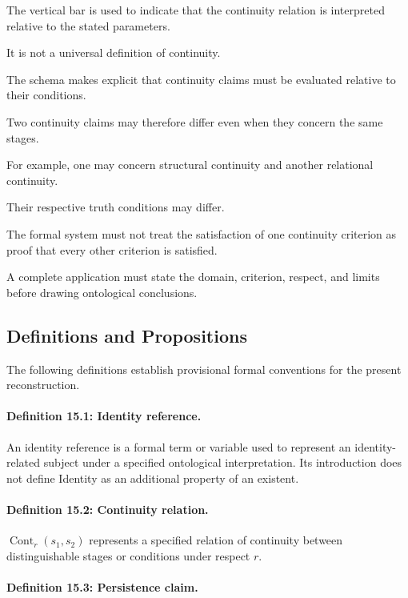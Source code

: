 The vertical bar is used
to indicate that the
continuity relation is
interpreted relative to
the stated parameters.

It is not a universal
definition of continuity.

The schema makes explicit
that continuity claims
must be evaluated relative
to their conditions.

Two continuity claims
may therefore differ
even when they concern
the same stages.

For example, one may
concern structural continuity
and another relational
continuity.

Their respective truth
conditions may differ.

The formal system must
not treat the satisfaction
of one continuity criterion
as proof that every
other criterion is satisfied.

A complete application
must state the domain,
criterion, respect, and
limits before drawing
ontological conclusions.

\subsection{Definitions and Propositions}

The following definitions
establish provisional
formal conventions for
the present reconstruction.

\paragraph{Definition 15.1: Identity reference.}

An identity reference
is a formal term or
variable used to represent
an identity-related subject
under a specified
ontological interpretation.
Its introduction does
not define Identity
as an additional property
of an existent.

\paragraph{Definition 15.2: Continuity relation.}

\(\operatorname{Cont}_{r}(s_1,s_2)\)
represents a specified
relation of continuity
between distinguishable
stages or conditions
under respect \(r\).

\paragraph{Definition 15.3: Persistence claim.}

